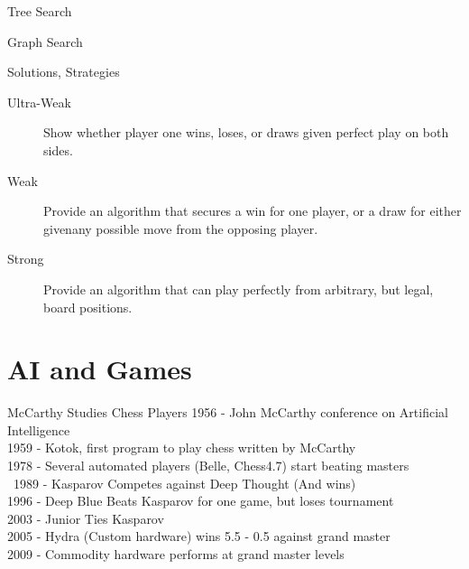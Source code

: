 \documentclass{powerdot}
\begin{document}
\begin{slide}{Tree Search}
\end{slide}

\begin{slide}{Graph Search}
\end{slide}

\begin{slide}{Solutions, Strategies}
  \begin{description}
    \item[Ultra-Weak] Show whether player one wins, loses, or draws given
      perfect play on both sides.
    \item[Weak] Provide an algorithm that secures a win for one player, or a
      draw for either givenany possible move from the opposing player.
    \item[Strong] Provide an algorithm that can play perfectly from
      arbitrary, but legal, board positions.
  \end{description}
\end{slide}

\section{AI and Games}

\begin{slide}{McCarthy Studies Chess Players}
  1956 - John McCarthy conference on Artificial Intelligence\\
  1959 - Kotok, first program to play chess written by McCarthy\\
  1978 - Several automated players (Belle, Chess4.7) start beating masters\\\
  1989 - Kasparov Competes against Deep Thought (And wins)\\
  1996 - Deep Blue Beats Kasparov for one game, but loses tournament\\
  2003 - Junior Ties Kasparov\\
  2005 - Hydra (Custom hardware) wins 5.5 - 0.5 against grand master\\
  2009 - Commodity hardware performs at grand master levels\\
\end{slide}
\end{document}
